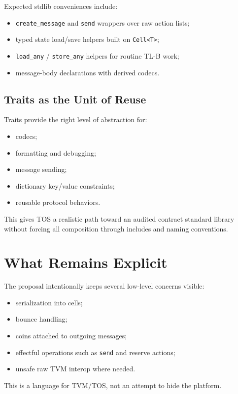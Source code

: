 \documentclass[12pt,oneside]{article}
\begin{document}
Expected stdlib conveniences include:

\begin{itemize}
\item \verb|create_message| and \verb|send| wrappers over raw action lists;
\item typed state load/save helpers built on \verb|Cell<T>|;
\item \verb|load_any| / \verb|store_any| helpers for routine TL-B work;
\item message-body declarations with derived codecs.
\end{itemize}

\subsection{Traits as the Unit of Reuse}
Traits provide the right level of abstraction for:

\begin{itemize}
\item codecs;
\item formatting and debugging;
\item message sending;
\item dictionary key/value constraints;
\item reusable protocol behaviors.
\end{itemize}

This gives TOS a realistic path toward an audited contract standard library
without forcing all composition through includes and naming conventions.

\section{What Remains Explicit}
The proposal intentionally keeps several low-level concerns visible:

\begin{itemize}
\item serialization into cells;
\item bounce handling;
\item coins attached to outgoing messages;
\item effectful operations such as \verb|send| and reserve actions;
\item unsafe raw TVM interop where needed.
\end{itemize}

This is a language for TVM/TOS, not an attempt to hide the platform.
\end{document}
